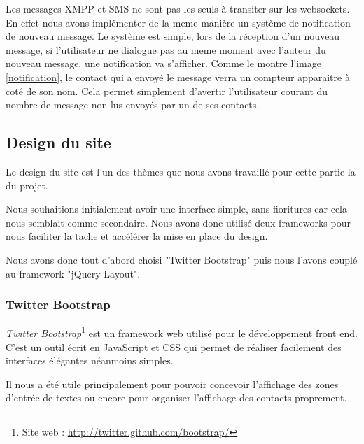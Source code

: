 Les messages XMPP et SMS ne sont pas les seuls à transiter sur les websockets. En effet nous avons 
implémenter de la meme manière un système de notification de nouveau message. Le système est simple,
lors de la réception d'un nouveau message, si l'utilisateur ne dialogue pas au meme moment avec l'auteur
du nouveau message, une notification va s'afficher. Comme le montre l'image \ref{notification}, le contact
qui a envoyé le message verra un compteur apparaitre à coté de son nom. Cela permet simplement d'avertir
l'utilisateur courant du nombre de message non lus envoyés par un de ses contacts.



\subsection{Design du site}

Le design du site est l'un des thèmes que nous avons travaillé pour cette partie la du projet.

Nous souhaitions initialement avoir une interface simple, sans fioritures car cela nous semblait comme
secondaire. Nous avons donc utilisé deux frameworks pour nous faciliter la tache et accélérer la mise
en place du design.

Nous avons donc tout d'abord choisi "Twitter Bootstrap" puis nous l'avons couplé au framework "jQuery
Layout".
\\


\subsubsection{Twitter Bootstrap}

\textit{Twitter Bootstrap}\footnote{Site web : \href{http://twitter.github.com/bootstrap/}{http://twitter.github.com/bootstrap/}} est un framework web utilisé pour le développement front end.
C'est un outil écrit en JavaScript et CSS qui permet de réaliser facilement des interfaces élégantes néanmoins simples. 

Il nous a été utile principalement pour pouvoir concevoir l'affichage des zones d'entrée de textes ou 
encore pour organiser l'affichage des contacts proprement.
\\


